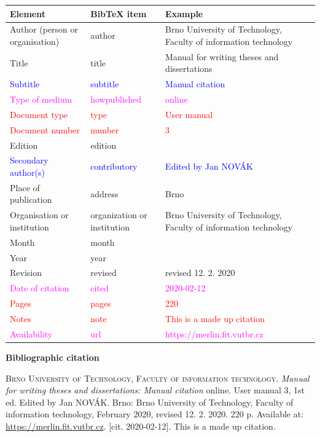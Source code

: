 \begin{tabularx}{0.95\linewidth}{>{\raggedright\arraybackslash}X X >{\raggedright\arraybackslash}X}
    Element & BibTeX item & Example\\\hline
    Author (person or organisation) & author & Brno University of Technology, Faculty of information technology\\
    Title & title & Manual for writing theses and dissertations\\
    \textcolor{blue}{Subtitle} & \textcolor{blue}{subtitle} & \textcolor{blue}{Manual citation}\\
    \textcolor{magenta}{Type of medium} & \textcolor{magenta}{howpublished} & \textcolor{magenta}{online}\\
    \textcolor{red}{Document type} & \textcolor{red}{type} & \textcolor{red}{User manual}\\
    \textcolor{red}{Document number} & \textcolor{red}{number} & \textcolor{red}{3}\\
    Edition & edition & 1\\
    \textcolor{blue}{Secondary author(s)} & \textcolor{blue}{contributory} & \textcolor{blue}{Edited by Jan NOVÁK}\\
    Place of publication & address & Brno\\
    Organisation or institution & organization or institution & Brno University of Technology, Faculty of information technology\\
    Month & month & 2\\
    Year & year & 2020\\
    Revision & revised & revised 12. 2. 2020\\
    \textcolor{magenta}{Date of citation} & \textcolor{magenta}{cited} & \textcolor{magenta}{2020-02-12}\\
    \textcolor{red}{Pages} & \textcolor{red}{pages} & \textcolor{red}{220}\\   
    \textcolor{red}{Notes} & \textcolor{red}{note} & \textcolor{red}{This is a made up citation}\\
    \textcolor{magenta}{Availability} & \textcolor{magenta}{url} & \textcolor{magenta}{https://merlin.fit.vutbr.cz}\\
\end{tabularx}

\bigskip

\noindent \textbf{Bibliographic citation}

\medskip

\noindent \textsc{Brno University of Technology, Faculty of information technology}. \textit{Manual for writing theses and dissertations: Manual citation} online. User manual 3, 1st ed. Edited by Jan NOVÁK.
Brno: Brno University of Technology, Faculty of information technology, February 2020, revised 12. 2. 2020. 220 p. Available at: \url{https://merlin.fit.vutbr.cz}. [cit. 2020-02-12]. This is a made up citation.
\newpage
